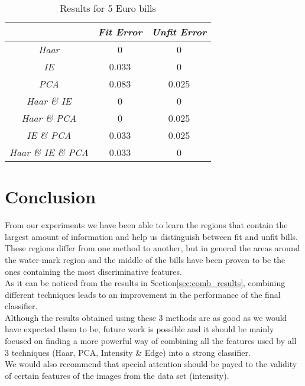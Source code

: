 \documentclass[11pt,twocolumn]{article}
\begin{document}
			\begin{table}[!htbp]
				\caption{Results for 5 Euro bills}
				\selectfont\small
				\label{table5}
				\centering 
				\begin{tabular}{ | c | c | c|}
					\hline\hline & \emph{Fit Error} & \emph{Unfit Error} \\ [0.5ex]\hline 
					\emph{Haar} & 0 & 0 \\ [0.5ex]\hline
					\emph{IE} & 0.033 & 0 \\ [0.5ex]\hline
					\emph{PCA} & 0.083 & 0.025 \\ [0.5ex]\hline
					\emph{Haar \& IE} & 0 & 0 \\ [0.5ex]\hline
					\emph{Haar \& PCA} & 0 & 0.025 \\ [0.5ex]\hline
					\emph{IE \& PCA} & 0.033 & 0.025 \\ [0.5ex]\hline
					\emph{Haar \& IE \& PCA} & 0.033 & 0 \\ [0.5ex]\hline
				\end{tabular}
				\label{table:nonlin5eur} 
			\end{table}


	\section{Conclusion}\label{sec:conclusion}
		\hspace*{10px}From our experiments we have been able to learn the regions
		that contain the largest amount of information and help us distinguish
		between fit and unfit bills. These regions differ from one method to another,
		but in general the areas around the water-mark region and the middle of the
		bills have been proven to be the ones containing the most discriminative
		features.\\ 
		\hspace*{10px}As it can be noticed from the results in
		Section\ref{sec:comb_results}, combining different techniques leads to an
		improvement in the performance of the final classifier.\\
		\hspace*{10px}Although the results obtained using these 3 methods are as good
		as we would have expected them to be, future work is possible and it should
		be mainly focused on finding a more powerful way of combining all the
		features used by all 3 techniques (Haar, PCA, Intensity \& Edge) into a
		strong classifier.\\ \hspace*{10px}We would also recommend that special
		attention should be payed to the validity of certain features of the images
		from the data set (intensity).\\
		
\end{document}
